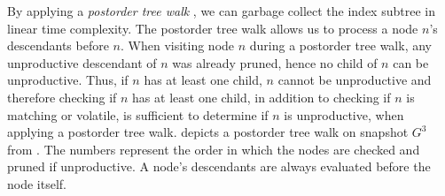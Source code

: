 \documentclass[abstracton,12pt]{scrartcl}
\theoremstyle{definition}
\begin{document}
By applying a
\textit{postorder tree walk} \cite{Cormen}, we can garbage collect the
index subtree in linear time complexity. The postorder tree walk allows us to
process a node $n$'s descendants before $n$. 
When visiting node $n$ during a postorder tree walk, any unproductive descendant
of $n$ was already pruned, hence no child of $n$ can be unproductive. Thus, if $n$
has at least one child, $n$ cannot be unproductive and therefore checking if $n$
has at least one child, in addition to checking if $n$ is matching or volatile,
is sufficient to determine if $n$ is unproductive, when applying a postorder
tree walk.
 depicts a postorder tree walk on snapshot $G^3$ from
. The numbers represent the
order in which the nodes are checked and pruned if unproductive. A node's
descendants are always evaluated before the node itself.
\end{document}
